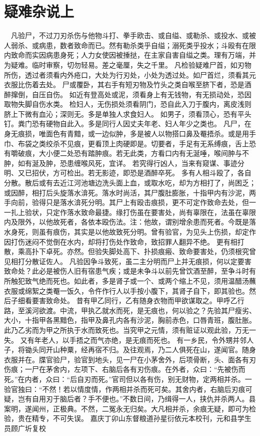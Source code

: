 \documentclass[12pt,UTF8]{ctexbook}
\begin{document}
\chapter{疑难杂说上}

　凡验尸，不过刀刃杀伤与他物斗打、拳手欧击、或自缢、或勒杀、或投水、或被人弱杀、或病患，数者致命而已。然有勒杀类乎自缢；溺死类乎投水；斗殴有在限内致命而实因病患身死；人力女使因被捶挞，在主家自害自缢之类。理有万端，并为疑难。临时审察，切勿轻易。差之毫厘，失之千里。
凡检验疑难尸首，如刃物所伤，透过者须看内外疮口，大处为行刃处，小处为透过处。如尸首烂，须看其元衣服比伤着去处。
尸或覆卧，其右手有短刃物及竹头之类自喉至脐下者，恐是酒醉撺倒，自压自伤。
如近有登高处或泥，须看身上有无钱物，有无损动处，恐因取物失脚自伤水类。
检妇人，无伤损处须看阴门，恐自此入刀于腹内，离皮浅则脐上下微有血沁；深则无。多是单独人求食妇人。
如男子，须看顶心，恐有平头钉。粪门恐有硬物自此入。多是同行人因丈夫年老、妇人年少之类也。
凡尸，在身无痕损，唯面色有青黯，或一边似肿，多是被人以物搭口鼻及罨捂杀。或是用手巾、布袋之类绞杀不见痕，更看顶上肉硬即是。切要者，手足有无系缚痕，舌上恐有嚼破痕，大小便二处恐有踏肿痕。若无此类，方看口内有无涎唾，喉间肿与不肿，如有涎及肿，恐患缠喉风死，宜详。
若究得行凶人，当来有窥谋、事迹分明、又已招伏，方可检出。若无影迹，即恐是酒醉卒死。
多有人相斗殴了，各自分散。散后或有去近江河池塘边洗头面上血，或取水吃，却为方相打了，尚困乏；或因醉，相打后头旋落水渰死。落水时尚活，其尸腹肚膨胀，十指甲内有沙泥，两手向前，验得只是落水渰死分明。其尸上有殴击痕损，更不可定作致命去处，但一一扎上验状，只定作落水致命最捷。缘打伤虽在要害处，尚有辜限在，法虽在辜限内及限外，以他故死者，各依本殴伤法。注：他故，谓别增余患而死者。今既是落水身死，则虽有痕伤，其实是以他故致死分明。曾有验官，为见头上伤损，却定作因打伤迷闷不觉倒在水内，却将打伤处作致命，致招罪人翻异不绝。
更有相打散，乘高扑下卓死。亦然。但验失脚处高下、扑损痕瘢、致命要害处，仍须根究曾见相打分散证佐人。
凡验因争斗致死，虽二主分明而尸上并无痕损，何以定要害致命处？此必是被伤人旧有宿患气疾；或是未争斗以前先曾饮酒至醉，至争斗时有所触犯致气绝而死也。如此者，多是肾子或一个、或两个缩上不见，须用温醋汤蘸衣服或绵絮之类罨一饭久，令仵作行人以手按小腹下，其肾子自下，即其验也。然后子细看要害致命处。
昔有甲乙同行，乙有随身衣物而甲欲谋取之。甲呼乙行路，至溪河欲渡。中流，甲执乙就水而死，是无痕也，何以验之？先验其尸瘦劣、大小，十指甲各黑黯色，指甲及鼻孔内各有沙泥，胸前赤色，口唇青班，腹肚胀。此乃乙劣而为甲之所执于水而致死也。当究甲之元情，须有赃证以观此验，万无一失。
又有年老人，以手捂之而气亦绝，是无痕而死也。
有一乡民，令外甥并邻人子，将锄头同开山种粟，经再宿不归。及往观焉，乃二人俱死在山，遂闻官。随身衣服并在。牒官验尸，验官到地头，见一尸在小茅舍外，后项骨断，头、面各有刃伤痕；一尸在茅舍内，左项下、右脑后各有刃伤痕。在外者，众曰：“先被伤而死。”在内者，众曰：“后自刃而死。”官司但以各有伤，别无财物，定两相并杀。一验官独曰：“不然！若以情度情，作两相并杀而死可矣。其舍内者，右脑后刃痕可疑，岂有自用刃于脑后者？手不便也。”不数日间，乃缉得一人，挟仇并杀两人。县案明，遂闻州，正极典。不然，二冤永无归矣。大凡相并杀，余痕无疑，即可为检验，贵在精专，不可失误。
嘉庆丁卯山东督粮道孙星衍依元本校刊，元和县学生员顾广圻复校
\end{document}
